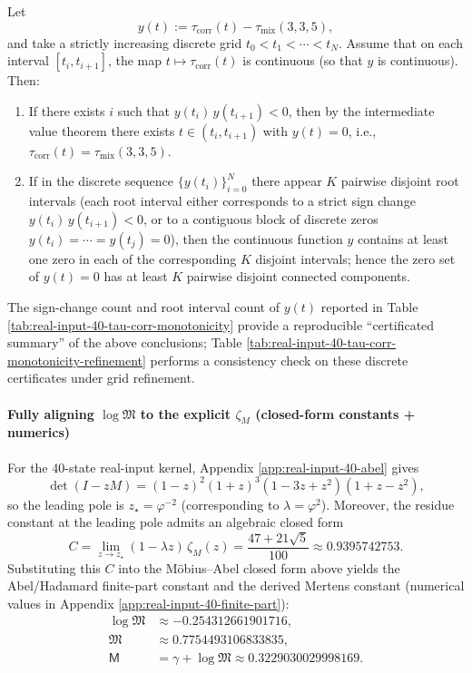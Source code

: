 \begin{remark}\label{prop:chi-slice-sign-change-certificate}
Let
\[
y(t):=\tau_{\mathrm{corr}}(t)-\tau_{\mathrm{mix}}(3,3,5),
\]
and take a strictly increasing discrete grid $t_0<t_1<\cdots<t_N$.
Assume that on each interval $[t_i,t_{i+1}]$, the map $t\mapsto \tau_{\mathrm{corr}}(t)$ is continuous (so that $y$ is continuous).
Then:
\begin{enumerate}
  \item If there exists $i$ such that $y(t_i)\,y(t_{i+1})<0$, then by the intermediate value theorem there exists $t\in(t_i,t_{i+1})$ with $y(t)=0$, i.e., $\tau_{\mathrm{corr}}(t)=\tau_{\mathrm{mix}}(3,3,5)$.
  \item If in the discrete sequence $\{y(t_i)\}_{i=0}^N$ there appear $K$ pairwise disjoint root intervals (each root interval either corresponds to a strict sign change $y(t_i)\,y(t_{i+1})<0$, or to a contiguous block of discrete zeros $y(t_i)=\cdots=y(t_j)=0$), then the continuous function $y$ contains at least one zero in each of the corresponding $K$ disjoint intervals; hence the zero set of $y(t)=0$ has at least $K$ pairwise disjoint connected components.
\end{enumerate}
The sign-change count and root interval count of $y(t)$ reported in Table \ref{tab:real-input-40-tau-corr-monotonicity} provide a reproducible ``certificated summary'' of the above conclusions; Table \ref{tab:real-input-40-tau-corr-monotonicity-refinement} performs a consistency check on these discrete certificates under grid refinement.
\end{remark}





\paragraph{Fully aligning \texorpdfstring{$\log\mathfrak{M}$}{logM} to the explicit \texorpdfstring{$\zeta_M$}{zeta\_M} (closed-form constants + numerics)}
For the 40-state real-input kernel, Appendix \ref{app:real-input-40-abel} gives
\[
\det(I-zM)=(1-z)^2(1+z)^3(1-3z+z^2)(1+z-z^2),
\]
so the leading pole is $z_\star=\varphi^{-2}$ (corresponding to $\lambda=\varphi^2$). Moreover, the residue constant at the leading pole admits an algebraic closed form
\[
C=\lim_{z\to z_\star}(1-\lambda z)\,\zeta_M(z)=\frac{47+21\sqrt5}{100}\approx 0.9395742753.
\]
Substituting this $C$ into the M\"{o}bius--Abel closed form above yields the Abel/Hadamard finite-part constant and the derived Mertens constant (numerical values in Appendix \ref{app:real-input-40-finite-part}):
\[
\begin{aligned}
\log\mathfrak{M}&\approx -0.254312661901716,\\
\mathfrak{M}&\approx 0.7754493106833835,\\
\mathsf{M}&=\gamma+\log\mathfrak{M}\approx 0.3229030029998169.
\end{aligned}
\]

